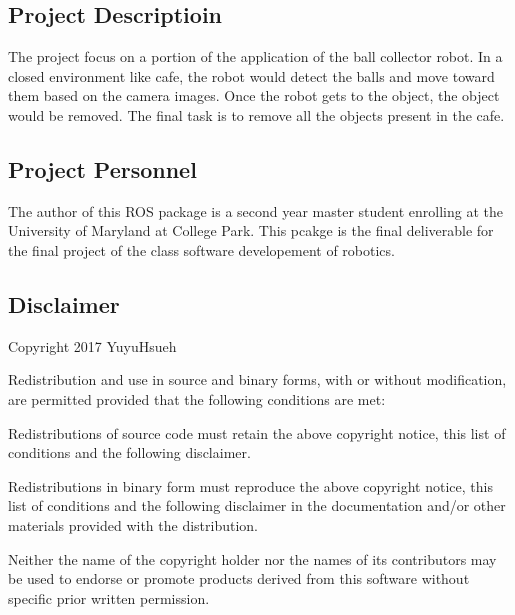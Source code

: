 \href{https://travis-ci.org/yhsueh/final_project}{\tt }

\subsection*{Project Descriptioin}

The project focus on a portion of the application of the ball collector robot. In a closed environment like cafe, the robot would detect the balls and move toward them based on the camera images. Once the robot gets to the object, the object would be removed. The final task is to remove all the objects present in the cafe.

\subsection*{Project Personnel}

The author of this R\+OS package is a second year master student enrolling at the University of Maryland at College Park. This pcakge is the final deliverable for the final project of the class software developement of robotics.

\subsection*{Disclaimer}

Copyright 2017 Yuyu\+Hsueh

Redistribution and use in source and binary forms, with or without modification, are permitted provided that the following conditions are met\+:


\begin{DoxyEnumerate}
\item Redistributions of source code must retain the above copyright notice, this list of conditions and the following disclaimer.
\item Redistributions in binary form must reproduce the above copyright notice, this list of conditions and the following disclaimer in the documentation and/or other materials provided with the distribution.
\item Neither the name of the copyright holder nor the names of its contributors may be used to endorse or promote products derived from this software without specific prior written permission.
\end{DoxyEnumerate}

